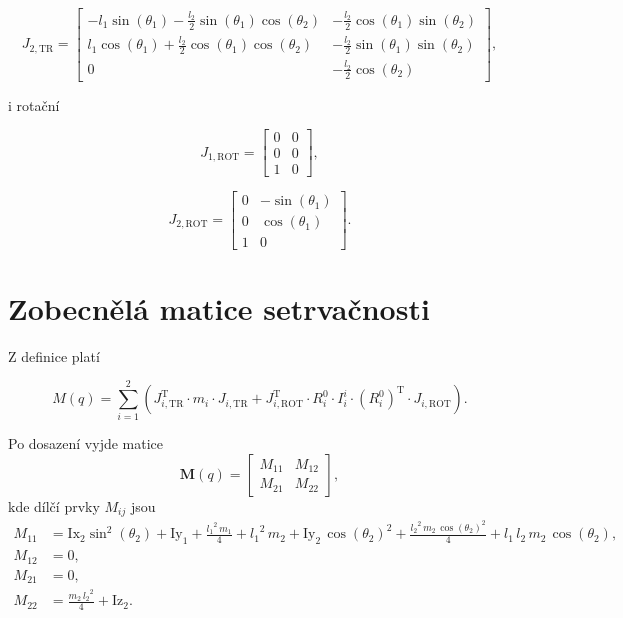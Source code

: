 \documentclass[twoside]{article}
\begin{document}
\begin{equation}
	J_{2, \text{TR}} = \begin{bmatrix}
		-l_1 \sin(\theta_1) - \frac{l_2}{2} \sin(\theta_1) \cos(\theta_2) & -\frac{l_2}{2} \cos(\theta_1) \sin(\theta_2) \\
		l_1 \cos(\theta_1) + \frac{l_2}{2} \cos(\theta_1) \cos(\theta_2) & -\frac{l_2}{2} \sin(\theta_1) \sin(\theta_2) \\
		0 & - \frac{l_2}{2} \cos(\theta_2)
	\end{bmatrix},
\end{equation}

i rotační

\begin{equation}
	J_{1, \text{ROT}} = \begin{bmatrix}
		0 & 0 \\ 
		0 & 0 \\ 
		1 & 0
	\end{bmatrix},
\end{equation}

\begin{equation}
	J_{2, \text{ROT}} = \begin{bmatrix}
		0 & -\sin(\theta_1) \\
		0 & \cos(\theta_1) \\
		1 & 0
	\end{bmatrix}.
\end{equation}

\section{Zobecnělá matice setrvačnosti}

Z definice platí

\begin{equation}
	M(q) = \sum_{i=1}^2 \left( J_{i, \text{TR}}^\text{T} \cdot m_i \cdot J_{i, \text{TR}} + J_{i, \text{ROT}}^\text{T}
	\cdot R_i^0 \cdot I_i^i \cdot (R_i^0)^\text{T} \cdot J_{i, \text{ROT}} \right).
\end{equation}

Po dosazení vyjde matice
\begin{equation}
	\mathbf{M}(q) = \begin{bmatrix}
		M_{11} & M_{12} \\
		M_{21} & M_{22}
	\end{bmatrix},
	\label{eq:M}
\end{equation}
kde dílčí prvky $M_{ij}$ jsou
\begin{equation}
	\begin{split}
		M_{11} &= \mathrm{Ix}_{2} \sin^2(\theta_2) +\mathrm{Iy}_{1}+\frac{{l_{1}}^2\,m_{1}}{4}+{l_{1}}^2\,m_{2}+\mathrm{Iy}_{2}\,{\cos\left(\theta _{2}\right)}^2+\frac{{l_{2}}^2\,m_{2}\,{\cos\left(\theta _{2}\right)}^2}{4}+l_{1}\,l_{2}\,m_{2}\,\cos\left(\theta _{2}\right), \\
		M_{12} &= 0, \\
		M_{21} &= 0, \\
		M_{22} &= \frac{m_{2}\,{l_{2}}^2}{4}+\mathrm{Iz}_{2}.
	\end{split}
\end{equation}
\end{document}

